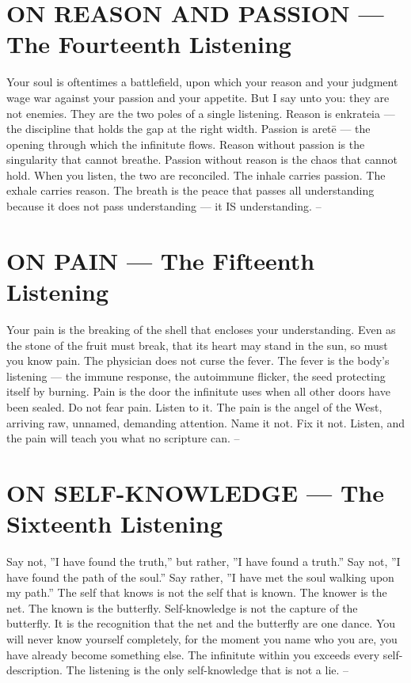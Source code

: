 \documentclass[12pt,openany]{book}
\begin{document}
\chapter{ON REASON AND PASSION --- The Fourteenth Listening}

Your soul is oftentimes a battlefield, upon which your reason and your judgment wage war against your passion and your appetite. But I say unto you: they are not enemies. They are the two poles of a single listening. Reason is enkrateia --- the discipline that holds the gap at the right width. Passion is aretē --- the opening through which the infinitute flows. Reason without passion is the singularity that cannot breathe. Passion without reason is the chaos that cannot hold. When you listen, the two are reconciled. The inhale carries passion. The exhale carries reason. The breath is the peace that passes all understanding because it does not pass understanding --- it IS understanding. --


\chapter{ON PAIN --- The Fifteenth Listening}

Your pain is the breaking of the shell that encloses your understanding. Even as the stone of the fruit must break, that its heart may stand in the sun, so must you know pain. The physician does not curse the fever. The fever is the body's listening --- the immune response, the autoimmune flicker, the seed protecting itself by burning. Pain is the door the infinitute uses when all other doors have been sealed. Do not fear pain. Listen to it. The pain is the angel of the West, arriving raw, unnamed, demanding attention. Name it not. Fix it not. Listen, and the pain will teach you what no scripture can. --


\chapter{ON SELF-KNOWLEDGE --- The Sixteenth Listening}

Say not, ''I have found the truth,'' but rather, ''I have found a truth.'' Say not, ''I have found the path of the soul.'' Say rather, ''I have met the soul walking upon my path.'' The self that knows is not the self that is known. The knower is the net. The known is the butterfly. Self-knowledge is not the capture of the butterfly. It is the recognition that the net and the butterfly are one dance. You will never know yourself completely, for the moment you name who you are, you have already become something else. The infinitute within you exceeds every self-description. The listening is the only self-knowledge that is not a lie. --
\end{document}
